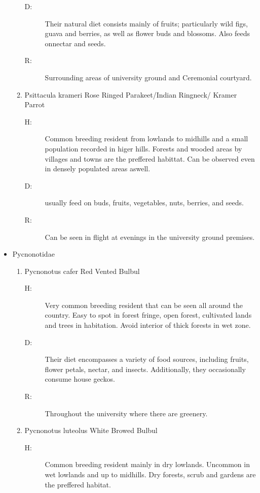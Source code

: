 \begin{itemize}
\begin{enumerate}
\begin{description}
\item[D: ]%
Their natural diet consists mainly of fruits; particularly wild figs, guava and berries, as well as flower buds and blossoms. Also feeds onnectar and seeds.%
\item[R: ]%
Surrounding areas of university ground and Ceremonial courtyard.%
\end{description}%
\item%
Psittacula krameri\newline%
Rose Ringed Parakeet/Indian Ringneck/ Kramer Parrot%
\begin{description}%
\item[H: ]%
Common breeding resident from lowlands to midhills and a small population recorded in higer hills. Forests and wooded areas by villages and towns are the preffered habittat. Can be observed even in densely populated areas aswell.%
\item[D: ]%
usually feed on buds, fruits, vegetables, nuts, berries, and seeds.%
\item[R: ]%
Can be seen in flight at evenings in the university ground premises.%
\end{description}%
\end{enumerate}%
\item%
Pycnonotidae%
\begin{enumerate}%
\item%
Pycnonotus cafer\newline%
Red Vented Bulbul%
\begin{description}%
\item[H: ]%
Very common breeding resident that can be seen all around the country. Easy to spot in forest fringe, open forest, cultivated lands and trees in habitation.  Avoid interior of thick forests in wet zone.%
\item[D: ]%
Their diet encompasses a variety of food sources, including fruits, flower petals, nectar, and insects. Additionally, they occasionally consume house geckos.%
\item[R: ]%
Throughout the university where there are greenery.%
\end{description}%
\item%
Pycnonotus luteolus\newline%
White Browed Bulbul%
\begin{description}%
\item[H: ]%
Common breeding resident mainly in dry lowlands. Uncommon in wet lowlands and up to midhills. Dry forests, scrub and gardens are the preffered habitat.%

\end{description}
\end{enumerate}
\end{itemize}
